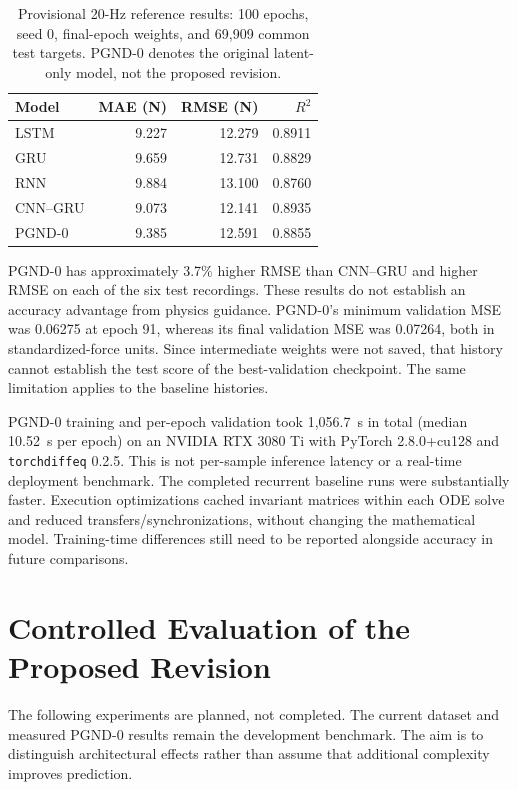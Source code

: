 \documentclass[journal,twoside]{IEEEtran}
\begin{document}
\begin{table}[t]
\caption{Provisional 20-Hz reference results: 100 epochs, seed 0,
final-epoch weights, and 69,909 common test targets. PGND-0 denotes the
original latent-only model, not the proposed revision.}
\label{tab:preliminary}
\centering
\begin{tabular}{lrrr}
\hline
Model & MAE (N) & RMSE (N) & $R^2$\\
\hline
LSTM & 9.227 & 12.279 & 0.8911\\
GRU & 9.659 & 12.731 & 0.8829\\
RNN & 9.884 & 13.100 & 0.8760\\
CNN--GRU & 9.073 & 12.141 & 0.8935\\
PGND-0 & 9.385 & 12.591 & 0.8855\\
\hline
\end{tabular}
\end{table}

PGND-0 has approximately 3.7\% higher RMSE than CNN--GRU and higher RMSE
on each of the six test recordings. These results do not establish an
accuracy advantage from physics guidance. PGND-0's minimum validation MSE
was 0.06275 at epoch 91, whereas its final validation MSE was 0.07264,
both in standardized-force units. Since intermediate weights were not
saved, that history cannot establish the test score of the best-validation
checkpoint. The same limitation applies to the baseline histories.

PGND-0 training and per-epoch validation took 1,056.7~s in total (median
10.52~s per epoch) on an NVIDIA RTX 3080 Ti with PyTorch 2.8.0+cu128 and
\texttt{torchdiffeq} 0.2.5. This is not per-sample inference latency or a
real-time deployment benchmark. The completed recurrent baseline runs were
substantially faster. Execution optimizations cached invariant matrices
within each ODE solve and reduced transfers/synchronizations, without
changing the mathematical model. Training-time differences still need to
be reported alongside accuracy in future comparisons.

\section{Controlled Evaluation of the Proposed Revision}
\label{sec:planned}

The following experiments are planned, not completed. The current dataset
and measured PGND-0 results remain the development benchmark. The aim is
to distinguish architectural effects rather than assume that additional
complexity improves prediction.
\end{document}
